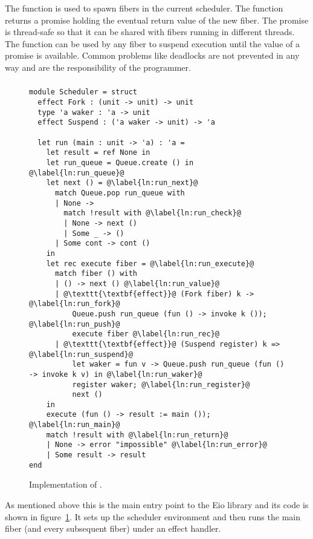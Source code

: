The  function is used to spawn fibers in the current scheduler.
The function returns a promise holding the eventual return value of the new fiber.
The promise is thread-safe so that it can be shared with fibers running in different threads.
The  function can be used by any fiber to suspend execution until the value of a promise is available.
Common problems like deadlocks are not prevented in any way and are the responsibility of the programmer.

\subsubsection{}
\label{sec:sched-impl-run}

\begin{figure}[ht]
  \begin{verbatim}
module Scheduler = struct
  effect Fork : (unit -> unit) -> unit
  type 'a waker : 'a -> unit
  effect Suspend : ('a waker -> unit) -> 'a

  let run (main : unit -> 'a) : 'a =
    let result = ref None in
    let run_queue = Queue.create () in @\label{ln:run_queue}@
    let next () = @\label{ln:run_next}@
      match Queue.pop run_queue with
      | None -> 
        match !result with @\label{ln:run_check}@
        | None -> next ()
        | Some _ -> ()
      | Some cont -> cont () 
    in
    let rec execute fiber = @\label{ln:run_execute}@
      match fiber () with
      | () -> next () @\label{ln:run_value}@
      | @\texttt{\textbf{effect}}@ (Fork fiber) k -> @\label{ln:run_fork}@
          Queue.push run_queue (fun () -> invoke k ()); @\label{ln:run_push}@
          execute fiber @\label{ln:run_rec}@
      | @\texttt{\textbf{effect}}@ (Suspend register) k => @\label{ln:run_suspend}@
          let waker = fun v -> Queue.push run_queue (fun () -> invoke k v) in @\label{ln:run_waker}@ 
          register waker; @\label{ln:run_register}@
          next ()
    in
    execute (fun () -> result := main ()); @\label{ln:run_main}@
    match !result with @\label{ln:run_return}@
    | None -> error "impossible" @\label{ln:run_error}@
    | Some result -> result
end
  \end{verbatim}
  \caption{Implementation of .}
  \label{fig:sched-impl-run}
\end{figure}

As mentioned above this is the main entry point to the Eio library and its code is shown in figure~\ref{fig:sched-impl-run}.
It sets up the scheduler environment and then runs the main fiber (and every subsequent fiber) under an effect handler.

